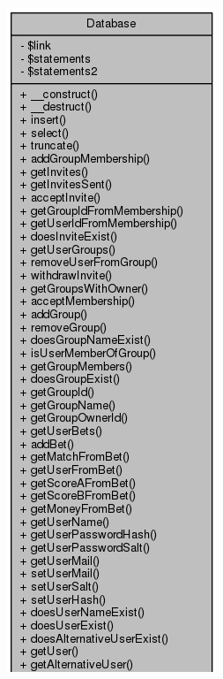 \documentclass[11pt]{article}
\begin{document}
\includegraphics[scale=0.4]{UML_Database1.png}
\end{document}
